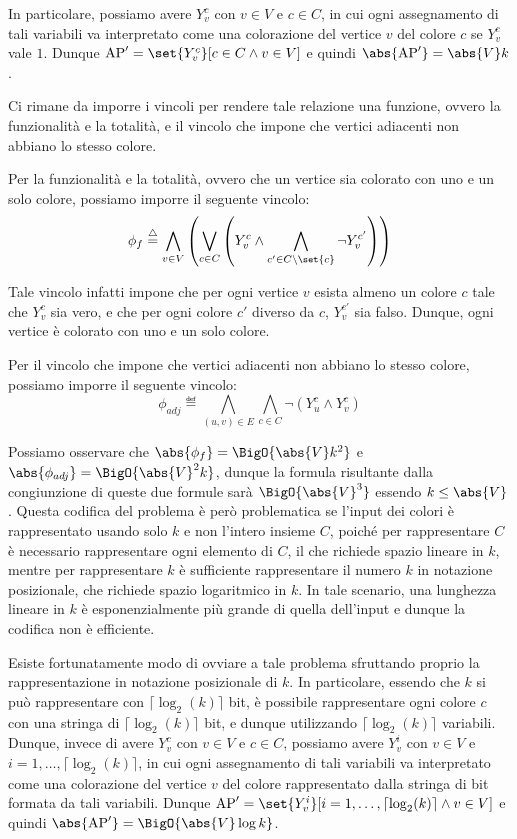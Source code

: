 In particolare, possiamo avere \(Y_v^c\) con \(v\in V\) e \(c\in C\), in cui ogni assegnamento di tali variabili va interpretato come una colorazione del vertice \(v\) del colore \(c\) se \(Y_v^c\) vale \(1\). Dunque \(\AP' = \set{Y_v^c}[c\in C \land v \in V]\) e quindi \(\abs{\AP'} = \abs{V}k\).

Ci rimane da imporre i vincoli per rendere tale relazione una funzione, ovvero la funzionalità e la totalità, e il vincolo che impone che vertici adiacenti non abbiano lo stesso colore.

Per la funzionalità e la totalità, ovvero che un vertice sia colorato con uno e un solo colore, possiamo imporre il seguente vincolo:
\[\phi_{f} \eqdef \bigwedge_{v\in V}\left(\bigvee_{c\in C} \left(Y_v^c \land \bigwedge_{c'\in C\setminus\set{c}} \neg Y_v^{c'}\right)\right)\]

Tale vincolo infatti impone che per ogni vertice \(v\) esista almeno un colore \(c\) tale che \(Y_v^c\) sia vero, e che per ogni colore \(c'\) diverso da \(c\), \(Y_v^{c'}\) sia falso. Dunque, ogni vertice è colorato con uno e un solo colore.

Per il vincolo che impone che vertici adiacenti non abbiano lo stesso colore, possiamo imporre il seguente vincolo:
\[\phi_{adj} \eqdef \bigwedge_{(u,v)\in E} \bigwedge_{c\in C} \neg (Y_u^c \land Y_v^c)\]

Possiamo osservare che \(\abs{\phi_{f}} = \BigO{\abs{V}k^2}\) e \(\abs{\phi_{adj}} = \BigO{\abs{V}^2k}\), dunque la formula risultante dalla congiunzione di queste due formule sarà \(\BigO{\abs{V}^3}\) essendo \(k\leq \abs{V}\). Questa codifica del problema è però problematica se l'input dei colori è rappresentato usando solo \(k\) e non l'intero insieme \(C\), poiché per rappresentare \(C\) è necessario rappresentare ogni elemento di \(C\), il che richiede spazio lineare in \(k\), mentre per rappresentare \(k\) è sufficiente rappresentare il numero \(k\) in notazione posizionale, che richiede spazio logaritmico in \(k\). In tale scenario, una lunghezza lineare in \(k\) è esponenzialmente più grande di quella dell'input e dunque la codifica non è efficiente. 

Esiste fortunatamente modo di ovviare a tale problema sfruttando proprio la rappresentazione in notazione posizionale di \(k\). In particolare, essendo che \(k\) si può rappresentare con \(\lceil \log_2(k) \rceil\) bit, è possibile rappresentare ogni colore \(c\) con una stringa di \(\lceil \log_2(k) \rceil\) bit, e dunque utilizzando \(\lceil \log_2(k) \rceil\) variabili. Dunque, invece di avere \(Y_v^c\) con \(v\in V\) e \(c\in C\), possiamo avere \(Y_v^i\) con \(v\in V\) e \(i=1,\dots,\lceil \log_2(k) \rceil\), in cui ogni assegnamento di tali variabili va interpretato come una colorazione del vertice \(v\) del colore rappresentato dalla stringa di bit formata da tali variabili. Dunque \(\AP' = \set{Y_v^i}[i=1,\dots,\lceil \log_2(k) \rceil \land v \in V]\) e quindi \(\abs{\AP'} = \BigO{\abs{V}\log k}\).

